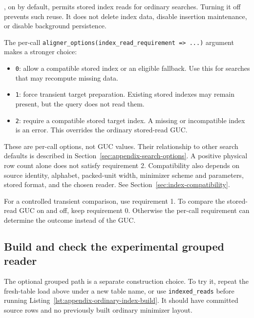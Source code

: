 , on by default, permits stored
index reads for ordinary searches. Turning it off prevents such reuse.
It does not delete index data, disable insertion maintenance, or disable
background persistence.

The per-call \texttt{aligner\_options(index\_read\_requirement => ...)}
argument makes a stronger choice:
\begin{itemize}
  \item \texttt{0}: allow a compatible stored index or an eligible
    fallback. Use this for searches that may recompute missing data.
  \item \texttt{1}: force transient target preparation. Existing stored
    indexes may remain present, but the query does not read them.
  \item \texttt{2}: require a compatible stored target index. A missing
    or incompatible index is an error. This overrides the ordinary
    stored-read GUC.
\end{itemize}

These are per-call options, not GUC values. Their relationship to other
search defaults is described in Section~\ref{sec:appendix-search-options}.
A positive physical row count alone does not satisfy requirement 2.
Compatibility also depends on source identity, alphabet, packed-unit
width, minimizer scheme and parameters, stored format, and the chosen
reader. See Section~\ref{sec:index-compatibility}.

For a controlled transient comparison, use requirement 1. To compare the
stored-read GUC on and off, keep requirement 0. Otherwise the per-call
requirement can determine the outcome instead of the GUC.

\subsection{Build and check the experimental grouped reader}

The optional grouped path is a separate construction choice. To try it,
repeat the fresh-table load above under a new table name, or use
\texttt{indexed\_reads} before running
Listing~\ref{lst:appendix-ordinary-index-build}. It should have committed
source rows and no previously built ordinary minimizer layout.

